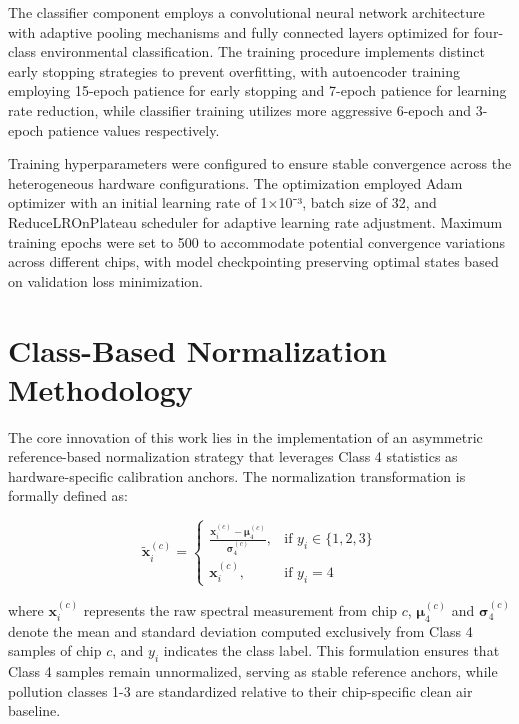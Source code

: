 The classifier component employs a convolutional neural network architecture with adaptive pooling mechanisms and fully connected layers optimized for four-class environmental classification. The training procedure implements distinct early stopping strategies to prevent overfitting, with autoencoder training employing 15-epoch patience for early stopping and 7-epoch patience for learning rate reduction, while classifier training utilizes more aggressive 6-epoch and 3-epoch patience values respectively.

Training hyperparameters were configured to ensure stable convergence across the heterogeneous hardware configurations. The optimization employed Adam optimizer with an initial learning rate of 1×10⁻³, batch size of 32, and ReduceLROnPlateau scheduler for adaptive learning rate adjustment. Maximum training epochs were set to 500 to accommodate potential convergence variations across different chips, with model checkpointing preserving optimal states based on validation loss minimization.

\section{Class-Based Normalization Methodology}

The core innovation of this work lies in the implementation of an asymmetric reference-based normalization strategy that leverages Class 4 statistics as hardware-specific calibration anchors. The normalization transformation is formally defined as:

\begin{equation}
\tilde{\mathbf{x}}^{(c)}_i = 
\begin{cases}
\displaystyle \frac{\mathbf{x}^{(c)}_i - \boldsymbol{\mu}^{(c)}_4}{\boldsymbol{\sigma}^{(c)}_4}, & \text{if } y_i \in \{1, 2, 3\} \\[0.3em]
\mathbf{x}^{(c)}_i, & \text{if } y_i = 4
\end{cases}
\label{eq:class_based_normalization}
\end{equation}

where $\mathbf{x}^{(c)}_i$ represents the raw spectral measurement from chip $c$, $\boldsymbol{\mu}^{(c)}_4$ and $\boldsymbol{\sigma}^{(c)}_4$ denote the mean and standard deviation computed exclusively from Class 4 samples of chip $c$, and $y_i$ indicates the class label. This formulation ensures that Class 4 samples remain unnormalized, serving as stable reference anchors, while pollution classes 1-3 are standardized relative to their chip-specific clean air baseline.

